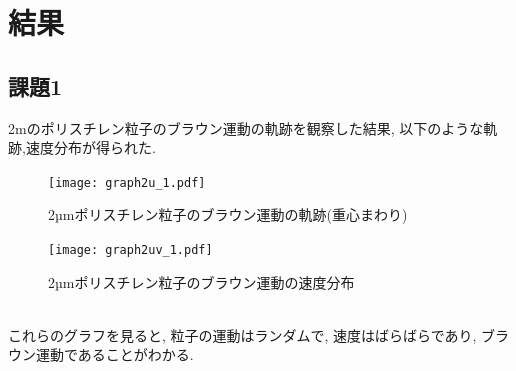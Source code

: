 \documentclass[11pt]{ltjsarticle}
\begin{document}
  \section*{結果}
    \subsection*{課題1}
      2\mu mのポリスチレン粒子のブラウン運動の軌跡を観察した結果, 以下のような軌跡,速度分布が得られた.\\
      \begin{minipage}{0.48\textwidth}
        \begin{figure}[H]
          \centering
          \texttt{[image: graph2u\_1.pdf]}
          \caption{2µmポリスチレン粒子のブラウン運動の軌跡(重心まわり)}
          \label{fig:2ps_track1}
        \end{figure}
      \end{minipage}
      \hfill
      \begin{minipage}{0.48\textwidth}
        \begin{figure}[H]
          \centering
          \texttt{[image: graph2uv\_1.pdf]}
          \caption{2µmポリスチレン粒子のブラウン運動の速度分布}
          \label{fig:2ps_speed1}
        \end{figure}
      \end{minipage}
      \\
      これらのグラフを見ると, 粒子の運動はランダムで, 速度はばらばらであり, ブラウン運動であることがわかる.
\end{document}
